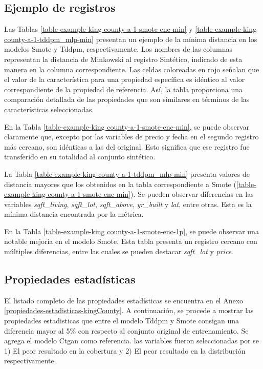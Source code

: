 
\newpage
\subsection{Ejemplo de registros}
\label{ejemplos-kingcounty}
Las Tablas \ref{table-example-king county-a-1-smote-enc-min} y \ref{table-example-king county-a-1-tddpm_mlp-min} presentan un ejemplo de la mínima distancia en los modelos Smote y Tddpm, respectivamente. Los nombres de las columnas representan la distancia de Minkowski al registro Sintético, indicado de esta manera en la columna correspondiente. Las celdas coloreadas en rojo señalan que el valor de la característica para una propiedad específica es idéntico al valor correspondiente de la propiedad de referencia. Así, la tabla proporciona una comparación detallada de las propiedades que son similares en términos de las características seleccionadas.

En la Tabla \ref{table-example-king county-a-1-smote-enc-min}, se puede observar claramente que, excepto por las variables de precio y fecha en el segundo registro más cercano, son idénticas a las del original. Esto significa que ese registro fue transferido en su totalidad al conjunto sintético. 



\newpage
La Tabla \ref{table-example-king county-a-1-tddpm_mlp-min} presenta valores de distancia mayores que los obtenidos en la tabla correspondiente a Smote (\ref{table-example-king county-a-1-smote-enc-min}). Se pueden observar diferencias en las variables \emph{sqft\_living}, \emph{sqft\_lot}, \emph{sqft\_above}, \emph{yr\_built} y \emph{lat}, entre otras. Esta es la mínima distancia encontrada por la métrica.

\newpage
En la Tabla \ref{table-example-king county-a-1-smote-enc-1p}, se puede observar una notable mejoría en el modelo Smote. Esta tabla presenta un registro cercano con múltiples diferencias, entre las cuales se pueden destacar \emph{sqft\_lot} y \emph{price}.

\newpage
\subsection{Propiedades estadísticas}
\label{propiedades-kingcounty}
El listado completo de las propiedades estadísticas se encuentra en el Anexo \ref{propiedades-estadisticas-kingCounty}. A continuación, se procede a mostrar las propiedades estadisticas que entre el modelo Tddpm y Smote consigan una diferencia mayor al 5\% con respecto al conjunto original de entrenamiento. Se agrega el modelo Ctgan como referencia. las variables fueron seleccionadas por se 1) El peor resultado en la cobertura y 2) El peor resultado en la distribución respectivamente.

